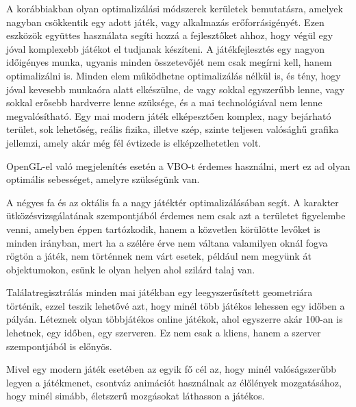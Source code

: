 \label{Chap:osszegzes}

A korábbiakban olyan optimalizálási módszerek kerületek bemutatásra, amelyek nagyban csökkentik egy adott játék, vagy alkalmazás erőforrásigényét. Ezen eszközök együttes használata segíti hozzá a fejlesztőket ahhoz, hogy végül egy jóval komplexebb játékot el tudjanak készíteni. A játékfejlesztés egy nagyon időigényes munka, ugyanis minden összetevőjét nem csak megírni kell, hanem optimalizálni is. Minden elem működhetne optimalizálás nélkül is, és tény, hogy jóval kevesebb munkaóra alatt elkészülne, de vagy sokkal egyszerűbb lenne, vagy sokkal erősebb hardverre lenne szüksége, és a mai technológiával nem lenne megvalósítható. Egy mai modern játék elképesztően komplex, nagy bejárható terület, sok lehetőség, reális fizika, illetve szép, szinte teljesen valósághű grafika jellemzi, amely akár még fél évtizede is elképzelhetetlen volt.

OpenGL-el való megjelenítés esetén a VBO-t érdemes használni, mert ez ad olyan optimális sebességet, amelyre szükségünk van.

A négyes fa és az oktális fa a nagy játéktér optimalizálásában segít. A karakter ütközésvizsgálatának szempontjából érdemes nem csak azt a területet figyelembe venni, amelyben éppen tartózkodik, hanem a közvetlen körülötte levőket is minden irányban, mert ha a szélére érve nem váltana valamilyen oknál fogva rögtön a játék, nem történnek nem várt esetek, például nem megyünk át objektumokon, esünk le olyan helyen ahol szilárd talaj van.

Találatregisztrálás minden mai játékban egy leegyszerűsített geometriára történik, ezzel teszik lehetővé azt, hogy minél több játékos lehessen egy időben a pályán. Léteznek olyan többjátékos online játékok, ahol egyszerre akár 100-an is lehetnek, egy időben, egy szerveren. Ez nem csak a kliens, hanem a szerver szempontjából is előnyös.

Mivel egy modern játék esetében az egyik fő cél az, hogy minél valóságszerűbb legyen a játékmenet, csontváz animációt használnak az élőlények mozgatásához, hogy minél simább, életszerű mozgásokat láthasson a játékos.


